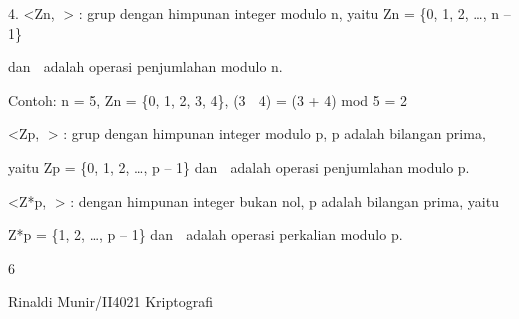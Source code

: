 \documentclass{article}
\begin{document}

4.  <Zn, > : grup dengan himpunan integer modulo n, yaitu Zn = \{0, 1, 2, …, n – 1\} 

dan  adalah operasi penjumlahan modulo n. 

    Contoh: n = 5, Zn = \{0, 1, 2, 3, 4\},   (3  4) =  (3 + 4) mod 5 = 2

  <Zp, > : grup dengan himpunan integer modulo p, p adalah bilangan prima, 

yaitu Zp = \{0, 1, 2, …, p – 1\} dan   adalah operasi penjumlahan modulo p. 

 <Z*p,  > : dengan himpunan integer bukan nol, p adalah bilangan prima, yaitu 

Z*p = \{1, 2, …, p – 1\} dan  adalah operasi perkalian modulo p. 

6

Rinaldi Munir/II4021 Kriptografi
\end{document}

